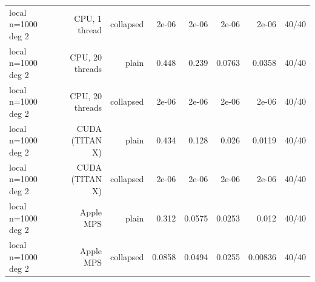 \begin{table}[H]
{\begin{tabular}{lrrrrrrr}
local n=1000 deg 2 & CPU, 1 thread & collapsed & 2e-06 & 2e-06 & 2e-06 & 2e-06 & 40/40 \\
local n=1000 deg 2 & CPU, 20 threads & plain & 0.448 & 0.239 & 0.0763 & 0.0358 & 40/40 \\
local n=1000 deg 2 & CPU, 20 threads & collapsed & 2e-06 & 2e-06 & 2e-06 & 2e-06 & 40/40 \\
local n=1000 deg 2 & CUDA (TITAN X) & plain & 0.434 & 0.128 & 0.026 & 0.0119 & 40/40 \\
local n=1000 deg 2 & CUDA (TITAN X) & collapsed & 2e-06 & 2e-06 & 2e-06 & 2e-06 & 40/40 \\
local n=1000 deg 2 & Apple MPS & plain & 0.312 & 0.0575 & 0.0253 & 0.012 & 40/40 \\
local n=1000 deg 2 & Apple MPS & collapsed & 0.0858 & 0.0494 & 0.0255 & 0.00836 & 40/40 \\
\bottomrule\end{tabular}}
\end{table}
